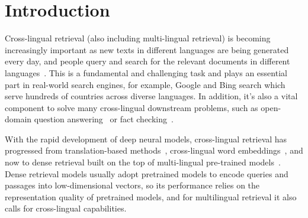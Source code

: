 \documentclass{article} %
\begin{document}
\section{Introduction}
\label{sec:intro}



Cross-lingual retrieval (also including multi-lingual retrieval) is becoming increasingly important as new texts in different languages are being generated every day, and people query and search for the relevant documents in different languages~\citep{zhang-etal-2021-mr, asai-etal-2021-xor}. This is a fundamental and challenging task and plays an essential part in real-world search engines, for example, Google and Bing search which serve hundreds of countries across diverse languages. In addition, it's also a vital component to solve many cross-lingual downstream problems, such as open-domain question answering~\citep{asai-etal-2021-xor} or fact checking~\citep{huang2022concrete}. 

With the rapid development of deep neural models, cross-lingual retrieval has progressed from translation-based methods~\citep{nie2010cross}, cross-lingual word embeddings~\citep{sun-duh-2020-clirmatrix}, and now to dense retrieval built on the top of multi-lingual pre-trained models~\citep{bert2019, conneau2019unsupervised}. 
Dense retrieval models usually adopt pretrained models to encode queries and passages into low-dimensional vectors, so its performance relies on the representation quality of pretrained models, and for multilingual retrieval it also calls for cross-lingual capabilities. 

\end{document}
